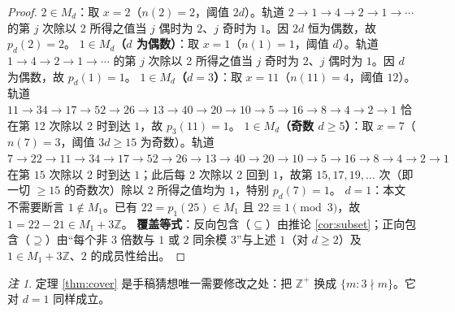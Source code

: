 \documentclass[11pt]{article}
\theoremstyle{definition}\newtheorem{definition}[theorem]{定义}
\theoremstyle{definition}\newtheorem{conjecture}[theorem]{猜想}
\theoremstyle{remark}\newtheorem{remark}[theorem]{注}
\begin{document}
\begin{proof}
\textbf{$2\in M_d$}：取 $x=2$（$n(2)=2$，阈值 $2d$）。轨道 $2\to1\to4\to2\to1\to\cdots$ 的第 $j$ 次除以 2 所得之值当 $j$ 偶时为 $2$、$j$ 奇时为 $1$。因 $2d$ 恒为偶数，故 $p_d(2)=2$。
\textbf{$1\in M_d$（$d$ 为偶数）}：取 $x=1$（$n(1)=1$，阈值 $d$）。轨道 $1\to4\to2\to1\to\cdots$ 的第 $j$ 次除以 2 所得之值当 $j$ 奇时为 $2$、$j$ 偶时为 $1$。因 $d$ 为偶数，故 $p_d(1)=1$。
\textbf{$1\in M_d$（$d=3$）}：取 $x=11$（$n(11)=4$，阈值 $12$）。轨道 $11\to34\to17\to52\to26\to13\to40\to20\to10\to5\to16\to8\to4\to2\to1$ 恰在第 12 次除以 2 时到达 $1$，故 $p_3(11)=1$。
\textbf{$1\in M_d$（奇数 $d\ge5$）}：取 $x=7$（$n(7)=3$，阈值 $3d\ge15$ 为奇数）。轨道 $7\to22\to11\to34\to17\to52\to26\to13\to40\to20\to10\to5\to16\to8\to4\to2\to1$ 在第 $15$ 次除以 2 时到达 $1$；此后每 2 次除以 2 回到 $1$，故第 $15,17,19,\dots$ 次（即一切 $\ge15$ 的奇数次）除以 2 所得之值均为 $1$，特别 $p_d(7)=1$。
\textbf{$d=1$}：本文不需要断言 $1\notin M_1$。已有 $22=p_1(25)\in M_1$ 且 $22\equiv1\pmod3$，故 $1=22-21\in M_1+3\mathbb{Z}$。
\textbf{覆盖等式}：反向包含（$\subseteq$）由推论 \ref{cor:subset}；正向包含（$\supseteq$）由“每个非 3 倍数与 $1$ 或 $2$ 同余模 3”与上述 $1$（对 $d\ge2$）及 $1\in M_1+3\mathbb{Z}$、$2$ 的成员性给出。
\end{proof}
\begin{remark}\label{rem:cover}
定理 \ref{thm:cover} 是手稿猜想唯一需要修改之处：把 $\mathbb{Z}^+$ 换成 $\{m:3\nmid m\}$。它对 $d=1$ 同样成立。
\end{remark}
\end{document}
